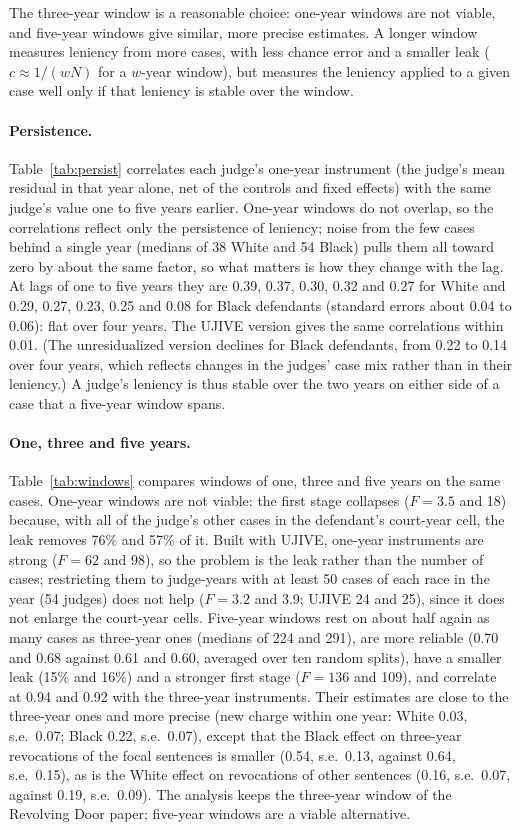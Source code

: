 \documentclass[11pt]{article}
\begin{document}
The three-year window is a reasonable choice: one-year windows are not viable, and five-year windows give similar, more precise estimates. A longer window measures leniency from more cases, with less chance error and a smaller leak ($c \approx 1/(wN)$ for a $w$-year window), but measures the leniency applied to a given case well only if that leniency is stable over the window.

\paragraph{Persistence.} Table~\ref{tab:persist} correlates each judge's one-year instrument (the judge's mean residual in that year alone, net of the controls and fixed effects) with the same judge's value one to five years earlier. One-year windows do not overlap, so the correlations reflect only the persistence of leniency; noise from the few cases behind a single year (medians of 38 White and 54 Black) pulls them all toward zero by about the same factor, so what matters is how they change with the lag. At lags of one to five years they are 0.39, 0.37, 0.30, 0.32 and 0.27 for White and 0.29, 0.27, 0.23, 0.25 and 0.08 for Black defendants (standard errors about 0.04 to 0.06): flat over four years. The UJIVE version gives the same correlations within 0.01. (The unresidualized version declines for Black defendants, from 0.22 to 0.14 over four years, which reflects changes in the judges' case mix rather than in their leniency.) A judge's leniency is thus stable over the two years on either side of a case that a five-year window spans.

\paragraph{One, three and five years.} Table~\ref{tab:windows} compares windows of one, three and five years on the same cases. One-year windows are not viable: the first stage collapses ($F = 3.5$ and 18) because, with all of the judge's other cases in the defendant's court-year cell, the leak removes 76\% and 57\% of it. Built with UJIVE, one-year instruments are strong ($F = 62$ and 98), so the problem is the leak rather than the number of cases; restricting them to judge-years with at least 50 cases of each race in the year (54 judges) does not help ($F = 3.2$ and 3.9; UJIVE 24 and 25), since it does not enlarge the court-year cells. Five-year windows rest on about half again as many cases as three-year ones (medians of 224 and 291), are more reliable (0.70 and 0.68 against 0.61 and 0.60, averaged over ten random splits), have a smaller leak (15\% and 16\%) and a stronger first stage ($F = 136$ and 109), and correlate at 0.94 and 0.92 with the three-year instruments. Their estimates are close to the three-year ones and more precise (new charge within one year: White 0.03, s.e.\ 0.07; Black 0.22, s.e.\ 0.07), except that the Black effect on three-year revocations of the focal sentences is smaller (0.54, s.e.\ 0.13, against 0.64, s.e.\ 0.15), as is the White effect on revocations of other sentences (0.16, s.e.\ 0.07, against 0.19, s.e.\ 0.09). The analysis keeps the three-year window of the Revolving Door paper; five-year windows are a viable alternative.
\end{document}
